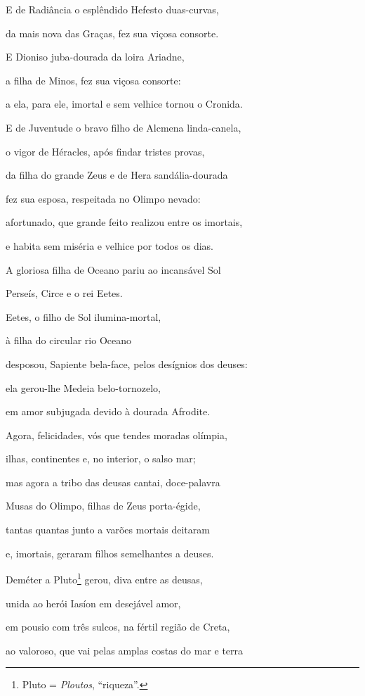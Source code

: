 \begin{pages}
\begin{Rightside}
\quad{}E de Radiância o esplêndido Hefesto duas-curvas, 

da mais nova das Graças, fez sua viçosa consorte.

\quad{}E Dioniso juba-dourada da loira Ariadne,

a filha de Minos, fez sua viçosa consorte:

a ela, para ele, imortal e sem velhice tornou o Cronida.

\quad{}E de Juventude o bravo filho de Alcmena linda-canela, 

o vigor de Héracles, após findar tristes provas,

da filha do grande Zeus e de Hera sandália-dourada

fez sua esposa, respeitada no Olimpo nevado:

afortunado, que grande feito realizou entre os imortais,

e habita sem miséria e velhice por todos os dias. 

\quad{}A gloriosa filha de Oceano pariu ao incansável Sol

Perseís, Circe e o rei Eetes.

Eetes, o filho de Sol ilumina-mortal,

à filha do circular rio Oceano

desposou, Sapiente bela-face, pelos desígnios dos deuses: 

ela gerou-lhe Medeia belo-tornozelo,

em amor subjugada devido à dourada Afrodite.

\medskip

Agora, felicidades, vós que tendes moradas olímpia,

ilhas, continentes e, no interior, o salso mar;

mas agora a tribo das deusas cantai, doce-palavra 

Musas do Olimpo, filhas de Zeus porta-égide,

tantas quantas junto a varões mortais deitaram

e, imortais, geraram filhos semelhantes a deuses.

\quad{}Deméter a Pluto\footnote{Pluto = \emph{Ploutos}, ``riqueza''.} gerou, diva entre as deusas,

unida ao herói Iasíon em desejável amor, 

em pousio com três sulcos, na fértil região de Creta,

ao valoroso, que vai pelas amplas costas do mar e terra


\end{Rightside}
\end{pages}
